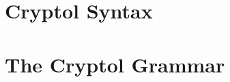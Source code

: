 \chapter{Cryptol Syntax}
\label{cha:crypt-synt}


\label{sec:crypt-synt-summ}


\chapter{The Cryptol Grammar}
\label{cha:cryptol-grammar}

